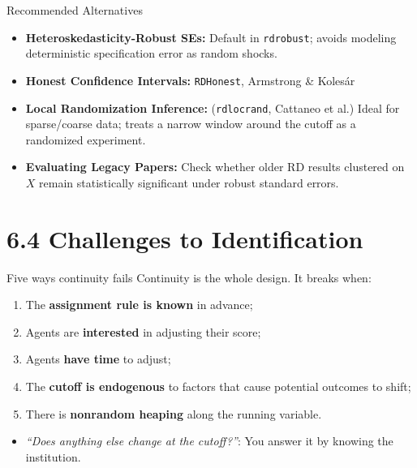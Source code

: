 \documentclass[
  11pt,
  ignorenonframetext,
  aspectratio=169,
]{beamer}
\providecommand{\tightlist}{%
  \setlength{\itemsep}{0pt}\setlength{\parskip}{0pt}}
\begin{document}
\begin{frame}[fragile]{Recommended Alternatives}
\protect{}\label{recommended-alternatives}
\begin{itemize}
\tightlist
\item
  \textbf{Heteroskedasticity-Robust SEs:} Default in \texttt{rdrobust};
  avoids modeling deterministic specification error as random shocks.
\item
  \textbf{Honest Confidence Intervals:} \texttt{RDHonest}, Armstrong \&
  Kolesár
\item
  \textbf{Local Randomization Inference:} (\texttt{rdlocrand}, Cattaneo
  et al.) Ideal for sparse/coarse data; treats a narrow window around
  the cutoff as a randomized experiment.
\item
  \textbf{Evaluating Legacy Papers:} Check whether older RD results
  clustered on \(X\) remain statistically significant under robust
  standard errors.
\end{itemize}
\end{frame}

\section{6.4 Challenges to
Identification}\label{challenges-to-identification}

\begin{frame}{Five ways continuity fails}
\protect{}\label{five-ways-continuity-fails}
Continuity is the whole design. It breaks when:

\begin{enumerate}
\tightlist
\item
  The \textbf{assignment rule is known} in advance;
\item
  Agents are \textbf{interested} in adjusting their score;
\item
  Agents \textbf{have time} to adjust;
\item
  The \textbf{cutoff is endogenous} to factors that cause potential
  outcomes to shift;
\item
  There is \textbf{nonrandom heaping} along the running variable.
\end{enumerate}

\vspace{0.6em}

\begin{itemize}
\tightlist
\item
  \emph{``Does anything else change at the cutoff?''}: You answer it by
  knowing the institution.
\end{itemize}
\end{frame}
\end{document}
